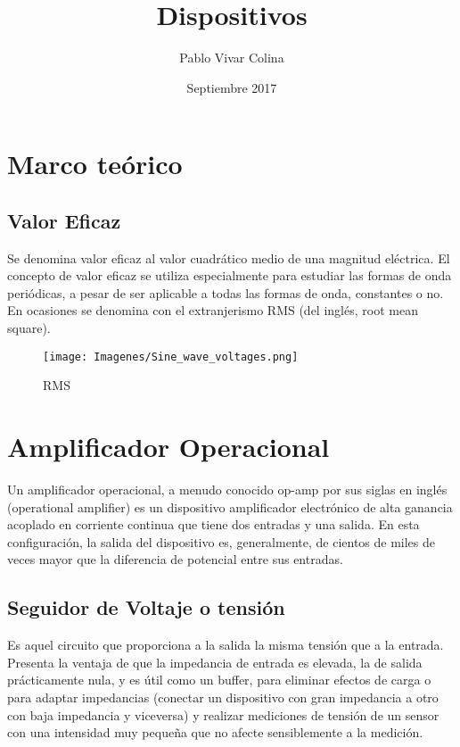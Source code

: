 \documentclass{article}
\title{Dispositivos}
\author{Pablo Vivar Colina}
\date{Septiembre 2017}
\begin{document}


\section{Marco teórico}

\subsection{Valor Eficaz}

Se denomina valor eficaz al valor cuadrático medio de una magnitud eléctrica. El concepto de valor eficaz se utiliza especialmente para estudiar las formas de onda periódicas, a pesar de ser aplicable a todas las formas de onda, constantes o no. En ocasiones se denomina con el extranjerismo RMS (del inglés, root mean square).\citep{valorEficazWiki}\\

 \begin{figure}[h!]
     \centering
     \texttt{[image: Imagenes/Sine\_wave\_voltages.png]}
     \caption{RMS}
     \label{fig:my_label}
 \end{figure}
 
 \section{Amplificador Operacional}

Un amplificador operacional, a menudo conocido op-amp por sus siglas en inglés (operational amplifier) es un dispositivo amplificador electrónico de alta ganancia acoplado en corriente continua que tiene dos entradas y una salida. En esta configuración, la salida del dispositivo es, generalmente, de cientos de miles de veces mayor que la diferencia de potencial entre sus entradas.\citep{AmplificadorOperacional}

\subsection{Seguidor de Voltaje o tensión}

Es aquel circuito que proporciona a la salida la misma tensión que a la entrada. Presenta la ventaja de que la impedancia de entrada es elevada, la de salida prácticamente nula, y es útil como un buffer, para eliminar efectos de carga o para adaptar impedancias (conectar un dispositivo con gran impedancia a otro con baja impedancia y viceversa) y realizar mediciones de tensión de un sensor con una intensidad muy pequeña que no afecte sensiblemente a la medición.\citep{AmplificadorOperacional}
\end{document}
